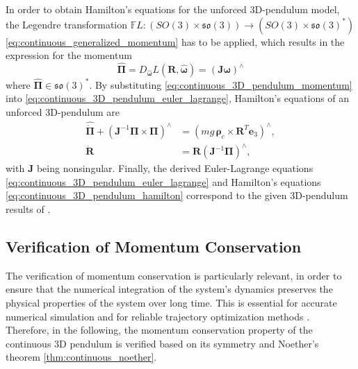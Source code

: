 In order to obtain Hamilton's equations for the unforced 3D-pendulum model, the Legendre transformation $\mathbb{F}L:(SO(3)\times\mathfrak{so}(3)) \to (SO(3) \times \mathfrak{so}(3)^*)$ \eqref{eq:continuous_generalized_momentum} has to be applied, which results in the expression for the momentum
\begin{equation}  \label{eq:continuous_3D_pendulum_momentum}
    \hat{\bm{\Pi}} = D_{\hat{\bm{\omega}}}L(\bm{R},\hat{\bm{\omega}}) = (\bm{J}\bm{\omega})^\wedge
\end{equation}
where $ \hat{\bm{\Pi}} \in \mathfrak{so}(3)^*$. By substituting \eqref{eq:continuous_3D_pendulum_momentum} into \eqref{eq:continuous_3D_pendulum_euler_lagrange}, Hamilton's equations of an unforced 3D-pendulum are 
\begin{subequations}\label{eq:continuous_3D_pendulum_hamilton}
\begin{align}
    \hat{\dot{\bm{\Pi}}} + (\bm{J}^{-1}\bm{\Pi} \times \bm{\Pi})^\wedge &= (mg\,\bm{\rho}_c \times \bm{R}^T \bm{e}_3)^\wedge,
    \label{eq:continuous_3D_pendulum_hamilton_momentum} \\
    \dot{\bm{R}} &= \bm{R}(\bm{J}^{-1}\bm{\Pi})^\wedge,
    \label{eq:continuous_3D_pendulum_hamilton_kinematics}
\end{align}
\end{subequations}
with $\bm{J}$ being nonsingular.
Finally, the derived Euler-Lagrange equations \eqref{eq:continuous_3D_pendulum_euler_lagrange} and Hamilton's equations \eqref{eq:continuous_3D_pendulum_hamilton} correspond to the given 3D-pendulum results of \cite{Lee2008}.

\subsection{Verification of Momentum Conservation}
\label{sec:continuous_3D_pendulum_momentum_validation}


The verification of momentum conservation is particularly relevant,
in order to ensure that the numerical integration of the system's dynamics preserves the physical properties of the system over long time. 
This is essential for accurate numerical simulation and for 
reliable trajectory optimization methods \cite{Sangli2025}. Therefore, in the following, the momentum conservation property of the continuous 3D pendulum is verified based on its symmetry and Noether's theorem \ref{thm:continuous_noether}.

